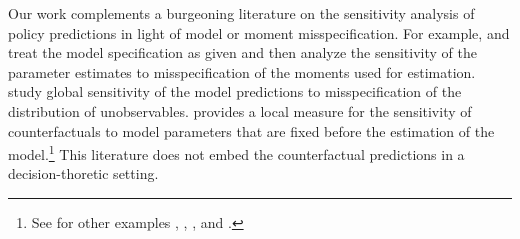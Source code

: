 {\noindent Our work complements a burgeoning literature on the sensitivity analysis of policy predictions in light of model or moment misspecification. For example, \cite{Andrews.2017} and \cite{Andrews.2020} treat the model specification as given and then analyze the sensitivity of the parameter estimates to misspecification of the moments used for estimation. \cite{Christensen.2019} study global sensitivity of the model predictions to misspecification of the distribution of unobservables. \cite{Jorgensen.2021} provides a local measure for the sensitivity of counterfactuals to model parameters that are fixed before the estimation of the model.\footnote{See for other examples \cite{Armstrong.2021}, \cite{Bonhomme.2020}, \cite{Bugni.2019}, and \cite{Mukhin.2018}.} This literature does not embed the counterfactual predictions in a decision-thoretic setting.\\




	
	
\newpage
  
  
% 



}  %

